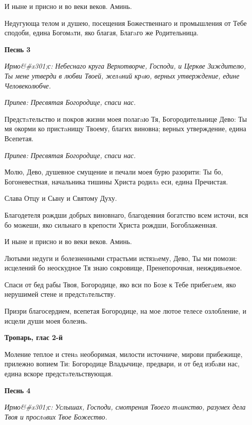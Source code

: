 И ныне и присно и во веки веков. Аминь.


Недугующа телом и душею, посещения Божественнаго и промышления от Тебе сподоби, едина Богомaти, яко благая, Благaго же Родительница.




\bfseries Песнь 3\normalfont{}


\itshape Ирмо&#x301;с:\normalfont{} Небеснаго круга Верхотворче, Господи, и Церкве Зиждителю, Ты мене утверди в любви Твоей, желaний крaю, верных утверждение, едине Человеколюбче.


\itshape Припев:\normalfont{} Пресвятая Богородице, спаси нас.


Предстaтельство и покров жизни моея полагaю Тя, Богородительнице Дево: Ты мя окорми ко пристaнищу Твоему, благих виновна; верных утверждение, едина Всепетая.


\itshape Припев:\normalfont{} Пресвятая Богородице, спаси нас.


Молю, Дево, душевное смущение и печали моея бурю разорити: Ты бо, Богоневестная, начальника тишины Христа родилa еси, едина Пречистая.


Слава Отцу и Сыну и Святому Духу.


Благодетеля рождши добрых виновнаго, благодеяния богатство всем источи, вся бо можеши, яко сильнаго в крепости Христа рождши, Богоблаженная.


И ныне и присно и во веки веков. Аминь.


Лютыми недуги и болезненными страстьми истязaему, Дево, Ты ми помози: исцелений бо неоскудное Тя знаю сокровище, Пренепорочная, неиждивaемое.


Спаси от бед рабы Твоя, Богородице, яко вси по Бозе к Тебе прибегaем, яко нерушимей стене и предстaтельству.


Призри благосердием, всепетая Богородице, на мое лютое телесе озлобление, и исцели души моея болезнь.




\bfseries Тропарь, глас 2-й\normalfont{}


Моление теплое и стенa необоримая, милости источниче, мирови прибежище, прилежно вопием Ти: Богородице Владычице, предвари, и от бед избaви нас, едина вскоре предстaтельствующая.




\bfseries Песнь 4\normalfont{}


\itshape Ирмо&#x301;с:\normalfont{} Услышах, Господи, смотрения Твоего тaинство, разумех дела Твоя и прослaвих Твое Божество.


